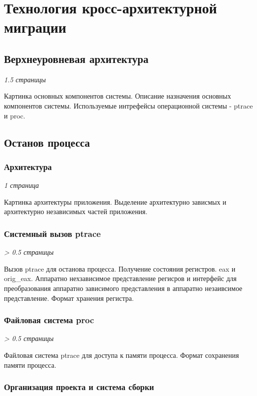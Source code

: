 \chapter{Технология кросс-архитектурной миграции}

\section{Верхнеуровневая архитектура}

\textit{1.5 страницы}

Картинка основных компонентов системы. Описание назначения основных компонентов системы. Используемые интрефейсы операционной системы - ptrace и proc.

\section{Останов процесса}

\subsection{Архитектура}

\textit{1 страница}

Картинка архитектуры приложения. Выделение архитектурно зависмых и архитектурно независимых частей приложения.

\subsection{Системный вызов ptrace}

\textit{> 0.5 страницы}

Вызов ptrace для останова процесса. Получение состояния регистров. eax и orig\_eax. Аппаратно нехзависимое представление регисров и интерфейс для преобразования аппаратно зависимого представления в аппаратно незаивсимое представление. Формат хранения регистра.

\subsection{Файловая система proc}

\textit{> 0.5 страницы}

Файловая система ptrace для доступа к памяти процесса. Формат сохранения памяти процесса.

\subsection{Организация проекта и система сборки}

